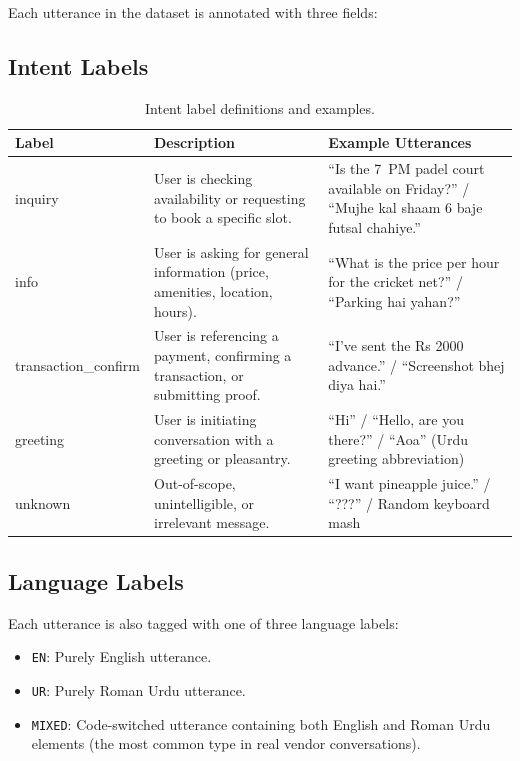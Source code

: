Each utterance in the dataset is annotated with three fields:

\subsection{Intent Labels}

\begin{table}[H]
\centering
\caption{Intent label definitions and examples.}
\label{tab:intent-defs}
\small
\begin{tabularx}{\textwidth}{@{}>{\raggedright\arraybackslash}p{}Y Y@{}}
\toprule
\textbf{Label} & \textbf{Description} & \textbf{Example Utterances} \\
\midrule
inquiry
  & User is checking availability or requesting to book a specific slot.
  & ``Is the 7~PM padel court available on Friday?'' /
    ``Mujhe kal shaam 6 baje futsal chahiye.'' \\[4pt]
info
  & User is asking for general information (price, amenities, location, hours).
  & ``What is the price per hour for the cricket net?'' /
    ``Parking hai yahan?'' \\[4pt]
transaction\_confirm
  & User is referencing a payment, confirming a transaction, or submitting proof.
  & ``I've sent the Rs 2000 advance.'' /
    ``Screenshot bhej diya hai.'' \\[4pt]
greeting
  & User is initiating conversation with a greeting or pleasantry.
  & ``Hi'' / ``Hello, are you there?'' / ``Aoa'' (Urdu greeting abbreviation) \\[4pt]
unknown
  & Out-of-scope, unintelligible, or irrelevant message.
  & ``I want pineapple juice.'' / ``???'' / Random keyboard mash \\
\bottomrule
\end{tabularx}
\end{table}

\subsection{Language Labels}

Each utterance is also tagged with one of three language labels:
\begin{itemize}
  \item \texttt{EN}: Purely English utterance.
  \item \texttt{UR}: Purely Roman Urdu utterance.
  \item \texttt{MIXED}: Code-switched utterance containing both English and Roman Urdu
        elements (the most common type in real vendor conversations).
\end{itemize}

